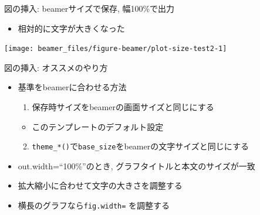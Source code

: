 \documentclass[
  12pt,
  ignorenonframetext,
]{beamer}
\providecommand{\tightlist}{%
  \setlength{\itemsep}{0pt}\setlength{\parskip}{0pt}}
\begin{document}
\begin{frame}{図の挿入: beamerサイズで保存, 幅100\%で出力}
\protect\hypertarget{ux56f3ux306eux633fux5165-beamerux30b5ux30a4ux30baux3067ux4fddux5b58-ux5e45100ux3067ux51faux529b}{}

\begin{itemize}
\tightlist
\item
  相対的に文字が大きくなった
\end{itemize}

\begin{center}\texttt{[image: beamer\_files/figure-beamer/plot-size-test2-1]} \end{center}

\end{frame}

\begin{frame}[fragile]{図の挿入: オススメのやり方}
\protect\hypertarget{ux56f3ux306eux633fux5165-ux30aaux30b9ux30b9ux30e1ux306eux3084ux308aux65b9}{}

\begin{itemize}
\tightlist
\item
  基準をbeamerに合わせる方法

  \begin{enumerate}
  \tightlist
  \item
    保存時サイズをbeamerの画面サイズと同じにする
  \end{enumerate}

  \begin{itemize}
  \tightlist
  \item
    このテンプレートのデフォルト設定
  \end{itemize}

  \begin{enumerate}
  \setcounter{enumi}{1}
  \tightlist
  \item
    \texttt{theme\_*()}で\texttt{base\_size}をbeamerの文字サイズと同じにする
  \end{enumerate}
\item
  out.width=``100\%''のとき, グラフタイトルと本文のサイズが一致
\item
  拡大縮小に合わせて文字の大きさを調整する
\item
  横長のグラフなら\texttt{fig.width=} を調整する
\end{itemize}

\end{frame}
\end{document}
